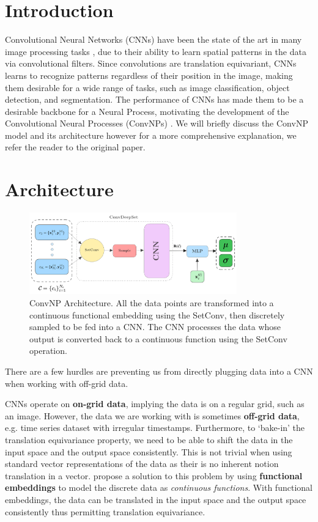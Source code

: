 \documentclass[../../main.tex]{subfiles}
\begin{document}
\section{Introduction}

Convolutional Neural Networks (CNNs) have been the state of the art in many image processing tasks \cite{he2015deep, simonyan2015deep, NIPS2012_c399862d}, due to their ability to learn spatial patterns in the data via convolutional filters. Since convolutions are translation equivariant, CNNs learns to recognize patterns regardless of their position in the image, making them desirable for a wide range of tasks, such as image classification, object detection, and segmentation. The performance of CNNs has made them to be a desirable backbone for a Neural Process, motivating the development of the Convolutional Neural Processes (ConvNPs) \cite{gordon2020convolutional}. We will briefly discuss the ConvNP model and its architecture however for a more comprehensive  explanation, we refer the reader to the original paper.

\section{Architecture}

\begin{figure}[H]
	\centering
	\includegraphics[width=0.8\textwidth]{convcnp.png}
	\caption{ConvNP Architecture. All the data points are transformed into a continuous functional embedding using the SetConv, then discretely sampled to be fed into a CNN. The CNN processes the data whose output is converted back to a continuous function using the SetConv operation.}
	\label{fig:convcnp}
\end{figure}


There are a few hurdles are preventing us from directly plugging data into a CNN when working with off-grid data.	

CNNs operate on \textbf{on-grid data}, implying the data is on a regular grid, such as an image. However, the data we are working with is sometimes \textbf{off-grid data}, e.g. time series dataset with irregular timestamps. Furthermore, to `bake-in' the translation equivariance property, we need to be able to shift the data in the input space and the output space consistently. This is not trivial when using standard vector representations of the data as their is no inherent notion translation in a vector.
\cite{gordon2020convolutional} propose a solution to this problem by using \textbf{functional embeddings} to model the discrete data as \emph{continuous functions}. With functional embeddings, the data can be translated in the input space and the output space consistently thus permitting translation equivariance.
\end{document}
